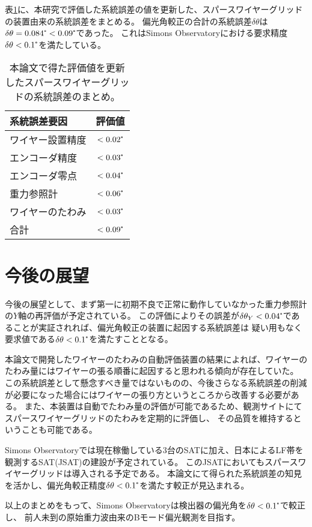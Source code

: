 \documentclass[../../main.tex]{subfiles}
\begin{document}
表\ref{tab:summary_systematic_error}に、本研究で評価した系統誤差の値を更新した、スパースワイヤーグリッドの装置由来の系統誤差をまとめる。
偏光角較正の合計の系統誤差$\delta\theta$は$\delta\theta=0.084\tcdegree<0.09\tcdegree$であった。
これはSimons Observatoryにおける要求精度$\delta\theta<0.1\tcdegree$を満たしている。

\begin{table}[H]
    \centering
    \caption{本論文で得た評価値を更新したスパースワイヤーグリッドの系統誤差のまとめ。}
    \begin{tabular}{lc}
        \hline\hline
        系統誤差要因 & 評価値 \\
        \hline
        ワイヤー設置精度 & $<0.02\tcdegree$ \\
        エンコーダ精度 & $<0.03\tcdegree$ \\
        エンコーダ零点 & $<0.04\tcdegree$ \\
        重力参照計\footnotemark[1]\footnotemark[2] & $<0.06\tcdegree$ \\
        ワイヤーのたわみ & $<0.03\tcdegree$ \\
        \hline
        合計 & $<0.09\tcdegree$ \\
        \hline\hline
    \end{tabular}
    \label{tab:summary_systematic_error}
\end{table}

\section{今後の展望}
今後の展望として、まず第一に初期不良で正常に動作していなかった重力参照計の$Y$軸の再評価が予定されている。
この評価によりその誤差が$\delta\theta_{Y}<0.04\tcdegree$であることが実証されれば、偏光角較正の装置に起因する系統誤差は
疑い用もなく要求値である$\delta\theta<0.1\tcdegree$を満たすこととなる。

本論文で開発したワイヤーのたわみの自動評価装置の結果によれば、ワイヤーのたわみ量にはワイヤーの張る順番に起因すると思われる傾向が存在していた。
この系統誤差として懸念すべき量ではないものの、今後さらなる系統誤差の削減が必要になった場合にはワイヤーの張り方というところから改善する必要がある。
また、本装置は自動でたわみ量の評価が可能であるため、観測サイトにてスパースワイヤーグリッドのたわみを定期的に評価し、
その品質を維持するということも可能である。

Simons Observatoryでは現在稼働している3台のSATに加え、日本によるLF帯を観測するSAT(JSAT)の建設が予定されている。
このJSATにおいてもスパースワイヤーグリッドは導入される予定である。
本論文にて得られた系統誤差の知見を活かし、偏光角較正精度$\delta\theta<0.1\tcdegree$を満たす較正が見込まれる。

以上のまとめをもって、Simons Observatoryは検出器の偏光角を$\delta\theta<0.1\tcdegree$で較正し、
前人未到の原始重力波由来のBモード偏光観測を目指す。
\end{document}
